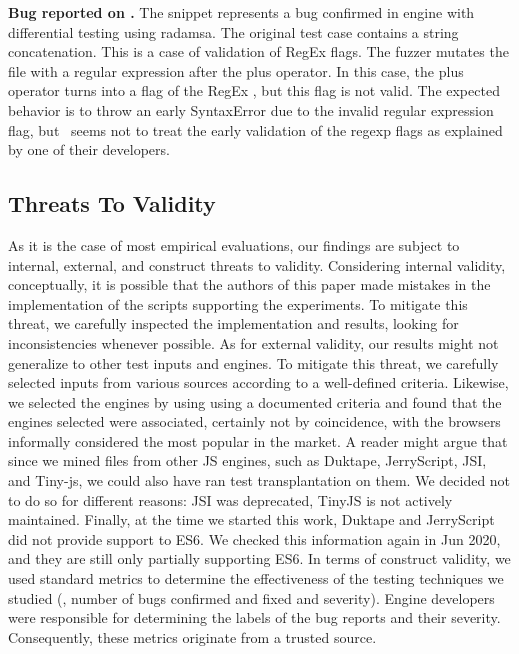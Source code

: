 \documentclass[smallextended]{svjour3}
\begin{document}
\vspace{1ex}\noindent\textbf{Bug reported on \hermes.} The snippet
 represents a bug confirmed in \textbf{\hermes} engine with
differential testing using radamsa.
The original test case contains a string concatenation.
This is a case of validation of RegEx flags. The fuzzer mutates
the file with a regular expression  after the plus operator.
In this case, the plus operator turns into a flag of the RegEx ,
but this flag is not valid. The expected behavior is to throw an early
SyntaxError due to the invalid regular expression flag,
but \hermes\ seems not to treat the early validation of the regexp flags
as explained by one of their developers.



\subsection{Threats To Validity}

As it is the case of most empirical evaluations, our findings are
subject to internal, external, and construct threats to
validity. Considering internal validity, conceptually, it is possible
that the authors of this paper made mistakes in the implementation of
the scripts supporting the experiments. To mitigate this threat, we
carefully inspected the implementation and results, looking for
inconsistencies whenever possible. As for external validity, our
results might not generalize to other test inputs and engines. To
mitigate this threat, we carefully selected inputs from various
sources according to a well-defined criteria. Likewise, we selected
the engines by using using a documented criteria and found that the
engines selected were associated, certainly not by coincidence, with
the browsers informally considered the most popular in the market.  A
reader might argue that since we mined files from other JS engines,
such as Duktape, JerryScript, JSI, and Tiny-js, we could also have ran
test transplantation on them. We decided not to do so for different
reasons: JSI was deprecated, TinyJS is not actively
maintained. Finally, at the time we started this work, Duktape and
JerryScript did not provide support to ES6. We checked this
information again in Jun 2020, and they are still only partially
supporting ES6. In terms of construct validity, we used standard
metrics to determine the effectiveness of the testing techniques we
studied (\eg{}, number of bugs confirmed and fixed and
severity). Engine developers were responsible for determining the
labels of the bug reports and their severity. Consequently, these
metrics originate from a trusted source.
\end{document}
